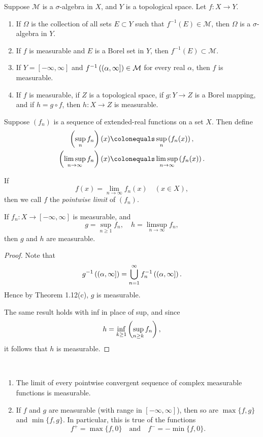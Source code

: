 \begin{proposition}
Suppose $\mathcal{M}$ is a $\sigma$-algebra in $X$, and $Y$ is a topological space. Let $f\colon X\to Y$.
\begin{enumerate}[label=(\roman*)]
\item If $\Omega$ is the collection of all sets $E\subset Y$ such that $f^{-1}(E)\in\mathcal{M}$, then $\Omega$ is a $\sigma$-algebra in $Y$.
\item If $f$ is measurable and $E$ is a Borel set in $Y$, then $f^{-1}(E)\subset\mathcal{M}$.
\item If $Y=[-\infty,\infty]$ and $f^{-1}\left((\alpha,\infty]\right)\in\mathcal{M}$ for every real $\alpha$, then $f$ is measurable.
\item If $f$ is measurable, if $Z$ is a topological space, if $g\colon Y\to Z$ is a Borel mapping, and if $h=g\circ f$, then $h\colon X\to Z$ is measurable.
\end{enumerate}
\end{proposition}

Suppose $(f_n)$ is a sequence of extended-real functions on a set $X$. 
Then define
\begin{align*}
\brac{\sup_{n}f_n}(x)&\colonequals\sup_{n}\brac{f_n(x)},\\
\brac{\limsup_{n\to\infty}f_n}(x)&\colonequals\limsup_{n\to\infty}\brac{f_n(x)}.
\end{align*}

If
\[f(x)=\lim_{n\to\infty}f_n(x)\quad(x\in X),\]
then we call $f$ the \emph{pointwise limit} of $(f_n)$.

\begin{proposition}
If $f_n:X\to[-\infty,\infty]$ is measurable, and
\[g=\sup_{n\ge1}f_n,\quad h=\limsup_{n\to\infty}f_n,\]
then $g$ and $h$ are measurable.
\end{proposition}

\begin{proof}
Note that
\[g^{-1}\left((\alpha,\infty]\right)=\bigcup_{n=1}^{\infty}f_n^{-1}\left((\alpha,\infty]\right).\]
Hence by Theorem 1.12(c), $g$ is measurable. 

The same result holds with inf in place of sup, and since
\[h=\inf_{k\ge1}\left(\sup_{n\ge k}f_n\right),\]
it follows that $h$ is measurable.
\end{proof}

\begin{corollary} \
\begin{enumerate}[label=(\roman*)]
\item The limit of every pointwise convergent sequence of complex measurable functions is measurable.
\item If $f$ and $g$ are measurable (with range in $[-\infty,\infty]$), then so are $\max\{f,g\}$ and $\min\{f,g\}$. In particular, this is true of the functions
\[f^+=\max\{f,0\}\quad\text{and}\quad f^-=-\min\{f,0\}.\] 
\end{enumerate}
\end{corollary}

